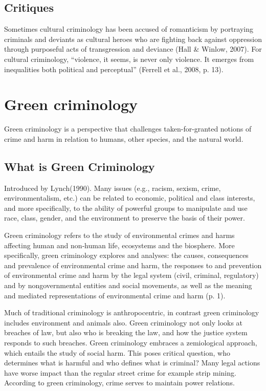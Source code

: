 \documentclass{article}
\begin{document}
\subsection{Critiques}

Sometimes cultural criminology has been accused of romanticism by portraying criminals and deviants as cultural heroes who are fighting back against oppression through purposeful acts of transgression and deviance (Hall \& Winlow, 2007). For cultural criminology, “violence, it seems, is never only violence. It emerges from inequalities both political and perceptual” (Ferrell et al., 2008, p. 13). 

\section{Green criminology}

Green criminology is a perspective that challenges taken-for-granted notions of crime and harm in relation to humans, other species, and the natural world.

\subsection{What is Green Criminology}

Introduced by Lynch(1990). Many issues (e.g., racism, sexism, crime, environmentalism, etc.) can be related to economic, political and class interests, and more specifically, to the ability of powerful groups to manipulate and use race, class, gender, and the environment to preserve the basis of their power.

Green criminology refers to the study of environmental crimes and harms affecting human and non‐human life, ecosystems and the biosphere. More specifically, green criminology explores and analyses: the causes, consequences and prevalence of environmental crime and harm, the responses to and prevention of environmental crime and harm by the legal system (civil, criminal, regulatory) and by nongovernmental entities and social movements, as well as the meaning and mediated representations of environmental crime and harm (p. 1).

Much of traditional criminology is anthropocentric, in contrast green criminology includes environment and animals also. Green criminology not only looks at breaches of law, but also who is breaking the law, and how the justice system responds to such breaches. Green criminology embraces a zemiological approach, which entails the study of social harm. This poses critical question, who determines what is harmful and who defines what is criminal? Many legal actions have worse impact than the regular street crime for example strip mining. According to green criminology, crime serves to maintain power relations.
\end{document}
